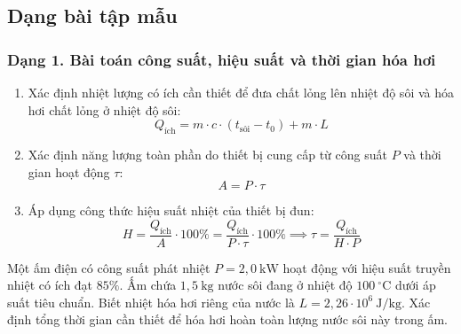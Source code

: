 

\subsection{Dạng bài tập mẫu}

\subsubsection{Dạng 1. Bài toán công suất, hiệu suất và thời gian hóa hơi}

\begin{phuongphap}
\begin{enumerate}
\item Xác định nhiệt lượng có ích cần thiết để đưa chất lỏng lên nhiệt độ sôi và hóa hơi chất lỏng ở nhiệt độ sôi:
\[
Q_{\text{ích}} = m \cdot c \cdot (t_{\text{sôi}} - t_0) + m \cdot L
\]
\item Xác định năng lượng toàn phần do thiết bị cung cấp từ công suất $P$ và thời gian hoạt động $\tau$:
\[
A = P \cdot \tau
\]
\item Áp dụng công thức hiệu suất nhiệt của thiết bị đun:
\[
H = \dfrac{Q_{\text{ích}}}{A} \cdot 100\% = \dfrac{Q_{\text{ích}}}{P \cdot \tau} \cdot 100\% \implies \tau = \dfrac{Q_{\text{ích}}}{H \cdot P}
\]
\end{enumerate}
\end{phuongphap}
\begin{vidumau}
Một ấm điện có công suất phát nhiệt $P = 2{,}0\ \mathrm{kW}$ hoạt động với hiệu suất truyền nhiệt có ích đạt $85\%$. Ấm chứa $1{,}5\ \mathrm{kg}$ nước sôi đang ở nhiệt độ $100\ ^\circ\mathrm{C}$ dưới áp suất tiêu chuẩn. Biết nhiệt hóa hơi riêng của nước là $L = 2{,}26 \cdot 10^6\ \mathrm{J/kg}$. Xác định tổng thời gian cần thiết để hóa hơi hoàn toàn lượng nước sôi này trong ấm.
\end{vidumau}

